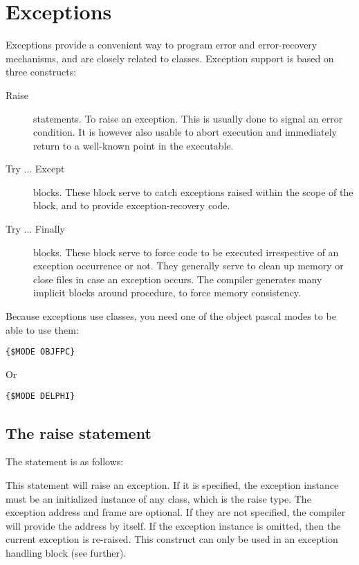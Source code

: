 \chapter{Exceptions}
\label{ch:Exceptions}
Exceptions provide a convenient way to program error and error-recovery
mechanisms, and are closely related to classes.
Exception support is based on three constructs:
\begin{description}
\item [Raise\ ] statements. To raise an exception. This is usually done to signal an
error condition. It is however also usable to
abort execution and immediately return to a well-known point in the
executable.
\item [Try ... Except\ ] blocks. These block serve to catch exceptions
raised within the scope of the block, and to provide exception-recovery
code.
\item [Try ... Finally\ ] blocks. These block serve to force code to be
executed irrespective of an exception occurrence or not. They generally
serve to clean up memory or close files in case an exception occurs.
The compiler generates many implicit  blocks around
procedure, to force memory consistency.
\end{description}

\begin{remark}
Because exceptions use classes, you need one of the object pascal modes to
be able to use them:
\begin{verbatim}
{$MODE OBJFPC}
\end{verbatim}
Or
\begin{verbatim}
{$MODE DELPHI}
\end{verbatim}
\end{remark}
\section{The raise statement}
The  statement is as follows:

This statement will raise an exception. If it is specified, the exception
instance must be an initialized instance of any class, which is the raise
type. The exception address and frame are optional. If they are not specified,
the compiler will provide the address by itself. If the exception instance is omitted,
then the current exception is re-raised. This construct can only be used
in an exception handling block (see further).

